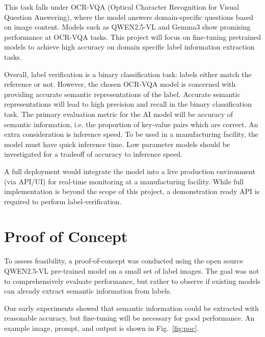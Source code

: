 \documentclass[conference]{IEEEtran}
\begin{document}
This task falls under OCR-VQA (Optical Character Recognition for Visual Question Answering), where the model answers domain-specific questions based on image content. Models such as QWEN2.5-VL and Gemma3 \cite{qwen2_5} \cite{gemma3} show promising performance at OCR-VQA tasks. This project will focus on fine-tuning pretrained models to achieve high accuracy on domain specific label information extraction tasks.

Overall, label verification is a binary classification task: labels either match the reference or not. However, the chosen OCR-VQA model is concerned with providing accurate semantic representations of the label. Accurate semantic representations will lead to high precision and recall in the binary classification task. The primary evaluation metric for the AI model will be accuracy of semantic information, i.e. the proportion of key-value pairs which are correct. An extra consideration is inference speed. To be used in a manufacturing facility, the model must have quick inference time. Low parameter models should be investigated for a tradeoff of accuracy to inference speed.

A full deployment would integrate the model into a live production environment (via API/UI) for real-time monitoring at a manufacturing facility. While full implementation is beyond the scope of this project, a demonstration ready API is required to perform label-verification.

\section{Proof of Concept}

To assess feasibility, a proof-of-concept was conducted using the open source QWEN2.5-VL pre-trained model on a small set of label images. The goal was not to comprehensively evaluate performance, but rather to observe if existing models can already extract semantic information from labels.

Our early experiments showed that semantic information could be extracted with reasonable accuracy, but fine-tuning will be necessary for good performance. An example image, prompt, and output is shown in Fig.~\ref{fig:poc}.
\end{document}
